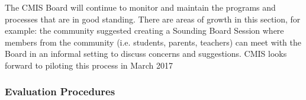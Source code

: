 \begin{findings}

The CMIS Board will continue to monitor and maintain the programs and processes that are in good standing. There are areas of growth in this section, for example: the community suggested creating a Sounding Board Session where members from the community (i.e. students, parents, teachers) can meet with the Board in an informal setting to discuss concerns and suggestions. CMIS looks forward to piloting this process in March 2017
\end{findings}

\subsubsection{Evaluation Procedures}



